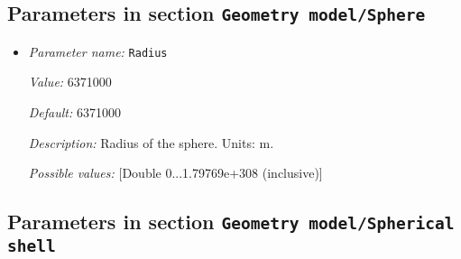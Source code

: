 \subsection{Parameters in section \tt Geometry model/Sphere}
\label{parameters:Geometry_20model/Sphere}

\begin{itemize}
\item {\it Parameter name:} {\tt Radius}
\label{parameters:Geometry model/Sphere/Radius}


{\it Value:} 6371000


{\it Default:} 6371000


{\it Description:} Radius of the sphere. Units: m.


{\it Possible values:} [Double 0...1.79769e+308 (inclusive)]
\end{itemize}

\subsection{Parameters in section \tt Geometry model/Spherical shell}
\label{parameters:Geometry_20model/Spherical_20shell}

